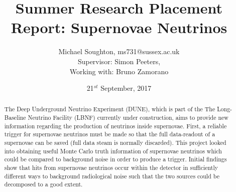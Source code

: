 \documentclass[a4paper,12,oneside,notitlepage]{report}
\begin{document}
\title{Summer Research Placement Report: Supernovae Neutrinos}
\author{Michael Soughton, ms731@sussex.ac.uk \\
Supervisor: Simon Peeters,  \\
Working with: Bruno Zamorano}
\date{21$^{st}$ September, 2017}
\maketitle
\providecommand{\e}[1]{\ensuremath{\times 10^{#1}}}


\vspace{14cm}
\begin{abstract}
\noindent
\begin{center}
The Deep Underground Neutrino Experiment (DUNE), which is part of the The Long-Baseline Neutrino Facility (LBNF) currently under construction, aims to provide new information regarding the production of neutrinos inside supernovae. First, a reliable trigger for supernovae neutrinos must be made so that the full data-readout of a supernovae can be saved (full data steam is normally discarded). This project looked into obtaining useful Monte Carlo truth information of supernovae neutrinos which could be compared to background noise in order to produce a trigger. Initial findings show that hits from supernovae neutrinos occur within the detector in sufficiently different ways to background radiological noise such that the two sources could be decomposed to a good extent.
\end{center}
\end{abstract}

\newpage
\end{document}
